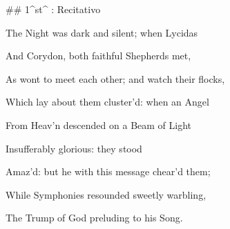 ## 1^st^ \mvmt: Recitativo

\beginnumbering
\pstart
The Night was dark and silent; when Lycidas 


And Corydon, both faithful Shepherds met, 

As wont to meet each other; and watch their flocks, 

Which lay about them cluster’d: when an Angel 

From Heav’n descended on a Beam of Light 

Insufferably glorious: they stood 

Amaz’d: but he with this message chear’d them; 

While Symphonies resounded sweetly warbling, 

The Trump of God preluding to his Song.
\pend
\endnumbering
